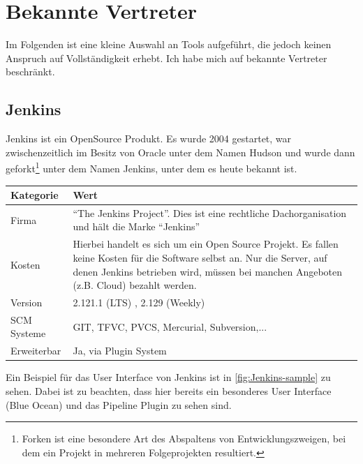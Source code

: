 \section{Bekannte Vertreter}
Im Folgenden ist eine kleine Auswahl an Tools aufgeführt, die jedoch keinen Anspruch auf Vollständigkeit erhebt. Ich habe mich auf bekannte Vertreter beschränkt.
\subsection{Jenkins}
Jenkins ist ein OpenSource Produkt. Es wurde 2004 gestartet, war zwischenzeitlich im Besitz von Oracle unter dem Namen Hudson und wurde dann geforkt\footnote{Forken ist eine besondere Art des Abspaltens von Entwicklungszweigen, bei dem ein Projekt in mehreren Folgeprojekten resultiert.} unter dem Namen Jenkins, unter dem es heute bekannt ist. 
\begin{center}
  \begin{tabularx}{\textwidth}{lX}
    \toprule
    Kategorie & Wert \\
    \midrule
    Firma & "`The Jenkins Project"'. Dies ist eine rechtliche Dachorganisation und hält die Marke "`Jenkins"' \\
		\addlinespace
    Kosten & Hierbei handelt es sich um ein Open Source Projekt. Es fallen keine Kosten für die Software selbst an. Nur die Server, auf denen Jenkins betrieben wird, müssen bei manchen Angeboten (z.B. Cloud) bezahlt werden. \\
		\addlinespace
		Version & 2.121.1 (LTS) , 2.129 (Weekly) \\
		\addlinespace
		SCM Systeme & GIT, TFVC, PVCS, Mercurial, Subversion,...\\
		\addlinespace
		Erweiterbar & Ja, via Plugin System\\
    \bottomrule
  \end{tabularx}
\end{center}
Ein Beispiel für das User Interface von Jenkins ist in \autoref{fig:Jenkins-sample} zu sehen. Dabei ist zu beachten, dass hier bereits ein besonderes User Interface (Blue Ocean) und das Pipeline Plugin zu sehen sind. 
